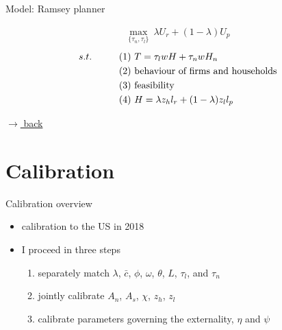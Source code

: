 \documentclass[11pt,aspectratio=169]{beamer}
\begin{document}
\begin{frame}{Model: {Ramsey planner}}
	
	\vspace{8mm}
	\begin{align*}
	\underset{\{\tau_n, \tau_l\}}{\max} \ \lambda U_{r}+(1-\lambda) U_{p}%
	\end{align*}
	\vspace{-10mm}
	\begin{align*}
	s.t. \hspace{10mm}& (1)\  T=\tau_l wH+\tau_nwH_{n}\\
	&	(2)\  \text{behaviour of firms and households}\\
	&(3) \ \text{feasibility}\\
	& (4)\ H =\lambda z_h l_r+(1-\lambda)z_l l_p
	\end{align*}
	
	\vspace{6mm}
	\hfill
	\hyperlink{backmodel}{\tiny{$\rightarrow$ back}}
\end{frame}

\section{Calibration}

\begin{frame}{Calibration overview}
	
	\begin{itemize}
		\item<+-> calibration to the US in 2018
		\item<+-> I proceed in three steps
		\vspace{4mm}
		\begin{enumerate}[<+-| alert@+>] %
			\item separately match $\lambda$, $\bar{c}$, $\phi$, $\omega$, $\theta$, $L$, $\tau_l$, and $\tau_n$
			\vspace{2mm}
			\item jointly calibrate $A_n$, $A_s$, $\chi$, $z_h$, $z_l$%
			\vspace{2mm}
			\item calibrate parameters governing the externality, $\eta$ and $\psi$
		\end{enumerate}
	\end{itemize}
\end{frame}
\end{document}
